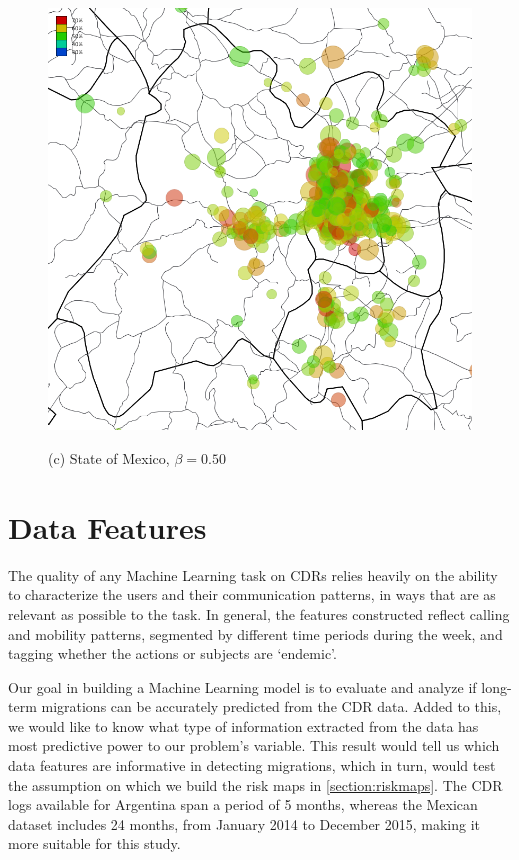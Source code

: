 \begin{figure}[p]
	\begin{minipage}{.6\linewidth}
		\centering
		\includegraphics[width=\columnwidth]
		{figures/estado_mexico_usuarios_volumen_circulos_allday_beta--50_min_volume--80_mexico_/estado_mexico_usuarios_volumen_circulos_allday_beta--50_min_volume--80_mexico_}

		(c) State of Mexico, $\beta = 0.50$
	\end{minipage}
\end{figure}



\section{Data Features}

The quality of any Machine Learning task on CDRs relies heavily on the ability to characterize the users and their communication patterns, in ways that are as relevant as possible to the task.
In general, the features constructed reflect calling and mobility patterns, segmented by different time periods during the week, and tagging whether the actions or subjects are `endemic'.

Our goal in building a Machine Learning model is to evaluate and analyze if long-term migrations can be accurately predicted from the CDR data.
Added to this, we would like to know what type of information extracted from the data has most predictive power to our problem's variable.
This result would tell us which data features are informative in detecting migrations, which in turn, would test the assumption on which we build the risk maps in \cref{section:riskmaps}.
The CDR logs available for Argentina span a period of 5 months, whereas the Mexican dataset includes 24 months, from January 2014 to December 2015, making it more suitable for this study.


